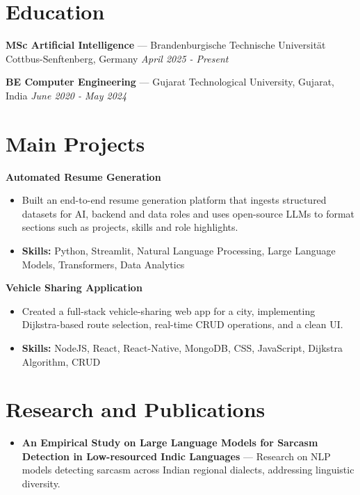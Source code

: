 \documentclass[a4paper,10pt]{article}
\begin{document}
\section*{Education}
\textbf{MSc Artificial Intelligence} — Brandenburgische Technische Universität Cottbus-Senftenberg, Germany \hfill \textit{April 2025 - Present}\par
\vspace{1.5pt}
\textbf{BE Computer Engineering} — Gujarat Technological University, Gujarat, India \hfill \textit{June 2020 - May 2024}\par

\section*{Main Projects}
\textbf{Automated Resume Generation}\par
\vspace{1pt}
\begin{itemize}
  \item Built an end-to-end resume generation platform that ingests structured datasets for AI, backend and data roles and uses open-source LLMs to format sections such as projects, skills and role highlights.
  \item \textbf{Skills:} Python, Streamlit, Natural Language Processing, Large Language Models, Transformers, Data Analytics
\end{itemize}
\vspace{3pt}
\textbf{Vehicle Sharing Application}\par
\vspace{1pt}
\begin{itemize}
  \item Created a full-stack vehicle-sharing web app for a city, implementing Dijkstra-based route selection, real-time CRUD operations, and a clean UI.
  \item \textbf{Skills:} NodeJS, React, React-Native, MongoDB, CSS, JavaScript, Dijkstra Algorithm, CRUD
\end{itemize}

\section*{Research and Publications}
\begin{itemize}
\item \textbf{An Empirical Study on Large Language Models for Sarcasm Detection in Low-resourced Indic Languages} — Research on NLP models detecting sarcasm across Indian regional dialects, addressing linguistic diversity.
\end{itemize}
\end{document}
